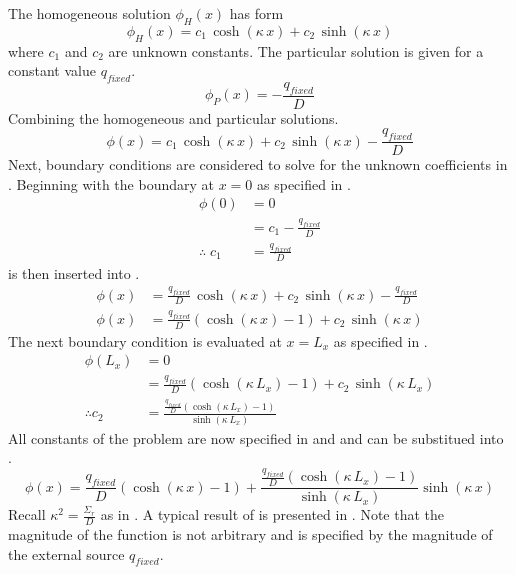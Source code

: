   The homogeneous solution $\phi_H(x)$ has form 
  \begin{equation}
    \label{eq:1dfixed_homog_form}
    \phi_H(x) = c_1 \, \cosh(\kappa \, x) + c_2 \, \sinh(\kappa \, x)
  \end{equation}
  where $c_1$ and $c_2$ are unknown constants.
  The particular solution is given for a constant value $q_{fixed}$.
  \begin{equation}
    \label{eq:1dfixed_particular}
    \phi_P(x) = -\frac{q_{fixed}}{D}
  \end{equation}
  Combining the homogeneous and particular solutions.
  \begin{equation}
    \label{eq:1dfixed_constants}
    \phi(x) = c_1 \, \cosh(\kappa \, x) + c_2 \, \sinh(\kappa \, x) -
      \frac{q_{fixed}}{D}
  \end{equation}
  Next, boundary conditions are considered to solve for the unknown coefficients
  in . Beginning with the boundary at $x=0$ as 
  specified in .
  \begin{align}
    \phi(0) &= 0 \\
    &= c_1 - \frac{q_{fixed}}{D} \\
    \label{eq:1dfixed_c1}
    \therefore \; c_1 &= \frac{q_{fixed}}{D}
  \end{align}
   is then inserted into .
  \begin{align}
    \phi(x) &= \frac{q_{fixed}}{D} \, \cosh(\kappa \, x) + c_2 \,
      \sinh(\kappa \, x) - \frac{q_{fixed}}{D} \\
    \phi(x) &= \frac{q_{fixed}}{D} \left( \cosh(\kappa \, x) -1 \right)
      + c_2 \, \sinh(\kappa \, x)
  \end{align}
  The next boundary condition is evaluated at $x=L_x$ as specified in
  .
  \begin{align}
    \phi(L_x) &= 0 \\
    &= \frac{q_{fixed}}{D} \left( \cosh(\kappa \, L_x ) - 1 \right) + 
      c_2 \, \sinh(\kappa \, L_x) \\
    \label{eq:1dfixed_c2}
    \therefore c_2 &= \frac{\frac{q_{fixed}}{D} \left(\cosh(\kappa \, L_x) -
      1 \right)} {\sinh(\kappa \, L_x)}
  \end{align}
  All constants of the problem are now specified in  and 
   and can be substitued into .
  \begin{equation}
    \label{eq:analytic_1dfixedsrc}
    \phi(x) = \frac{q_{fixed}}{D} \left( \cosh(\kappa\,x)-1 \right) +
    \frac{\frac{q_{fixed}}{D} 
    \left(\cosh(\kappa\,L_x)-1\right)}{\sinh(\kappa\,L_x)} \sinh(\kappa\,x)
  \end{equation}
  Recall $\kappa^2 = \frac{\Sigma_r}{D}$ as in . A typical 
  result of  is presented in
  . Note that the magnitude of the function is not
  arbitrary and is specified by the magnitude of the external source
  $q_{fixed}$.

